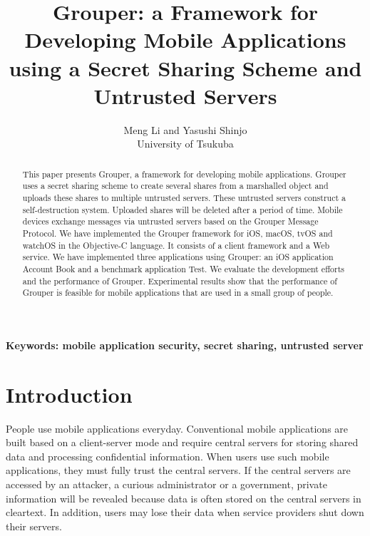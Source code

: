 \documentclass[twocolumn,10pt]{article}
\begin{document}
\title{\bf Grouper: a Framework for Developing Mobile Applications using a Secret Sharing Scheme and Untrusted Servers}

\author{
	Meng Li and Yasushi Shinjo \\
	University of Tsukuba
}

\maketitle

\begin{abstract}

This paper presents Grouper, a framework for developing mobile applications.
Grouper uses a secret sharing scheme to create several shares from a marshalled object and uploads these shares to multiple untrusted servers. 
These untrusted servers construct a self-destruction system.
Uploaded shares will be deleted after a period of time.
Mobile devices exchange messages via untrusted servers based on the Grouper Message Protocol.
We have implemented the Grouper framework for iOS, macOS, tvOS and watchOS in the Objective-C language.
It consists of a client framework and a Web service.
We have implemented three applications using Grouper: an iOS application Account Book and a benchmark application Test.
We evaluate the development efforts and the performance of Grouper. 
Experimental results show that the performance of Grouper is feasible for mobile applications that are used in a small group of people.

\end{abstract}

\textbf{Keywords: mobile application security, secret sharing, untrusted server}

\section{Introduction}

People use mobile applications everyday. 
Conventional mobile applications are built based on a client-server mode and require central servers for storing shared data and processing confidential information.
When users use such mobile applications, they must fully trust the central servers.
If the central servers are accessed by an attacker, a curious administrator or a government, private information will be revealed because data is often stored on the central servers in cleartext. 
In addition, users may lose their data when service providers shut down their servers.
\end{document}
